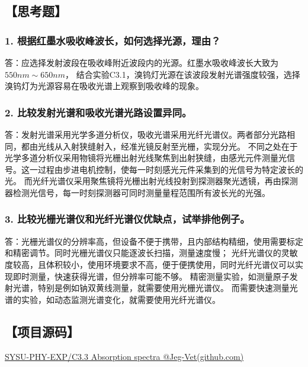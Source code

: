 \documentclass[12pt,a4paper,UTF8]{ctexart}
\begin{document}
\newpage
\subsection*{【思考题】}
\subsubsection*{1. 根据红墨水吸收峰波长，如何选择光源，理由？}
答：应选择发射波段在吸收峰附近波段内的光源。红墨水吸收峰波长大致为$550nm \sim 650nm$，
结合实验C3.1，溴钨灯光源在该波段发射光谱强度较强，选择溴钨灯为光源容易在吸收光谱上观察到吸收峰的现象。
\subsubsection*{2. 比较发射光谱和吸收光谱光路设置异同。}
答：发射光谱采用光学多道分析仪，吸收光谱采用光纤光谱仪。两者部分光路相同，都由光线从入射狭缝射入，经准光镜反射至光栅，实现分光。
不同之处在于光学多道分析仪采用物镜将光栅出射光线聚焦到出射狭缝，由感光元件测量光信号。这一过程由步进电机控制，使每一时刻感光元件采集到的光信号为特定波长的光。
而光纤光谱仪采用聚焦镜将光栅出射光线投射到探测器聚光透镜，再由探测器检测光信号，每一时刻探测器可同时测量量程范围所有波长光的光强。
\subsubsection*{3. 比较光栅光谱仪和光纤光谱仪优缺点，试举排他例子。}
答：光栅光谱仪的分辨率高，但设备不便于携带，且内部结构精细，使用需要标定和精密调节。同时光栅光谱仪只能逐波长扫描，测量速度慢；
光纤光谱仪的灵敏度较高，且体积较小，使用环境要求不高，便于便携使用，同时光纤光谱仪可以实现即时测量，快速获得光谱，但分辨率可能不够。
精密测量实验，如测量原子发射光谱，特别是例如钠双黄线测量，就需要使用光栅光谱仪。
而需要快速测量光谱的实验，如动态监测光谱变化，就需要使用光纤光谱仪。
\subsection*{【项目源码】}
\href{https://github.com/Jeg-Vet/SYSU-PHY-EXP/tree/main/C3.3-Absorption_spectra}{SYSU-PHY-EXP/C3.3 Absorption spectra @Jeg-Vet(github.com)}
\end{document}
